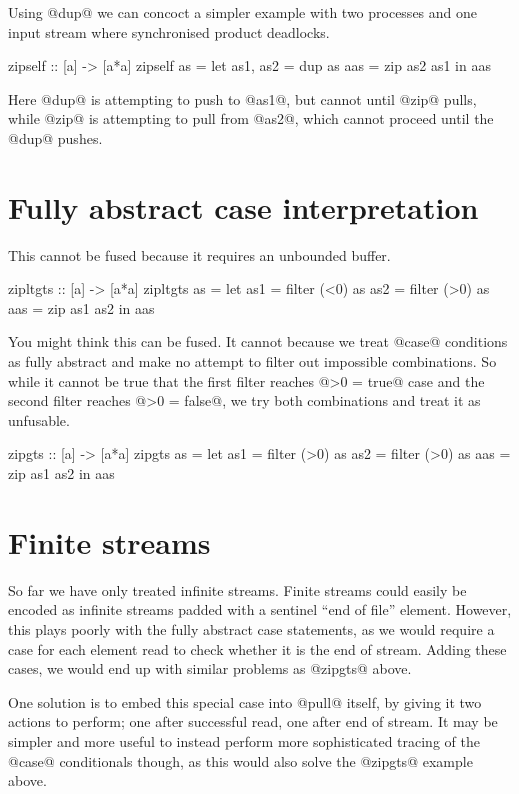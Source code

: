 Using @dup@ we can concoct a simpler example with two processes and one input stream where synchronised product deadlocks.
\begin{code}
zipself :: [a] -> [a*a]
zipself as =
  let as1, as2 = dup as
      aas = zip as2 as1
  in  aas
\end{code}
Here @dup@ is attempting to push to @as1@, but cannot until @zip@ pulls, while @zip@ is attempting to pull from @as2@, which cannot proceed until the @dup@ pushes.

\section{Fully abstract case interpretation}

This cannot be fused because it requires an unbounded buffer.
\begin{code}
zipltgts :: [a] -> [a*a]
zipltgts as =
  let as1 = filter (<0) as
      as2 = filter (>0) as
      aas = zip as1 as2
  in  aas
\end{code}

You might think this can be fused.
It cannot because we treat @case@ conditions as fully abstract and make no attempt to filter out impossible combinations.
So while it cannot be true that the first filter reaches @>0 = true@ case and the second filter reaches @>0 = false@, we try both combinations and treat it as unfusable.
\begin{code}
zipgts :: [a] -> [a*a]
zipgts as =
  let as1 = filter (>0) as
      as2 = filter (>0) as
      aas = zip as1 as2
  in  aas
\end{code}

\section{Finite streams}
So far we have only treated infinite streams.
Finite streams could easily be encoded as infinite streams padded with a sentinel ``end of file'' element.
However, this plays poorly with the fully abstract case statements, as we would require a case for each element read to check whether it is the end of stream.
Adding these cases, we would end up with similar problems as @zipgts@ above.

One solution is to embed this special case into @pull@ itself, by giving it two actions to perform; one after successful read, one after end of stream.
It may be simpler and more useful to instead perform more sophisticated tracing of the @case@ conditionals though, as this would also solve the @zipgts@ example above.



